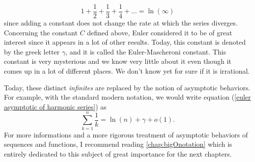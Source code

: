 \begin{equation} \label{harmonic = ln(infinity)}
    1 + \frac{1}{2} + \frac{1}{3} + \frac{1}{4} + \dots = \ln(\infty)
\end{equation}
since adding a constant does not change the rate at which the series diverges. Concerning the constant $C$ defined above, Euler considered it to be of great interest since it appears in a lot of other results. Today, this constant is denoted by the greek letter $\gamma$, and it is called the Euler-Mascheroni constant. This constant is very mysterious and we know very little about it even though it comes up in a lot of different places. We don't know yet for sure if it is irrational.

Today, these distinct \textit{infinites} are replaced by the notion of asymptotic behaviors. For example, with the standard modern notation, we would write equation (\ref{euler asymptotic of harmonic series}) as
\begin{equation} \label{modern asymptotic of harmonic series}
    \sum_{k=1}^{n}\frac{1}{k} = \ln(n) + \gamma + o(1).
\end{equation}
For more informations and a more rigorous treatment of asymptotic behaviors of sequences and functions, I recommend reading \autoref{chap:bigOnotation} which is entirely dedicated to this subject of great importance for the next chapters.

